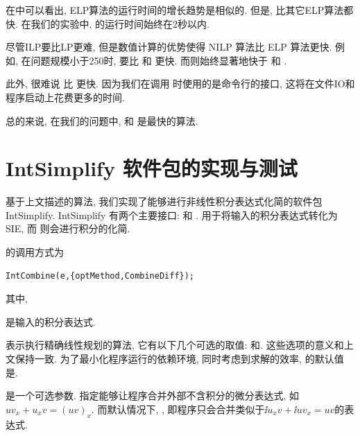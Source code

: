 在中可以看出, ELP算法的运行时间的增长趋势是相似的. 但是, 比其它ELP算法都快. 在我们的实验中, 的运行时间始终在2秒以内. 

尽管ILP要比LP更难, 但是数值计算的优势使得 NILP 算法比 ELP 算法更快. 例如, 在问题规模小于250时,  要比  和 更快. 而则始终显著地快于 和 . 

此外, 很难说  比  更快. 因为我们在调用 时使用的是命令行的接口, 这将在文件IO和程序启动上花费更多的时间.

总的来说, 在我们的问题中,  和  是最快的算法. 

\section{IntSimplify 软件包的实现与测试}\label{Results-03}
基于上文描述的算法, 我们实现了能够进行非线性积分表达式化简的软件包 IntSimplify. IntSimplify 有两个主要接口:  和 .  用于将输入的积分表达式转化为SIE, 而 则会进行积分的化简.

的调用方式为
\begin{verbatim}
IntCombine(e,{optMethod,CombineDiff});
\end{verbatim}
其中, 
\begin{compactitem}[\textbullet]
\item {}是输入的积分表达式.
\item {}表示执行精确线性规划的算法, 它有以下几个可选的取值: 和. 这些选项的意义和上文保持一致. 为了最小化程序运行的依赖环境, 同时考虑到求解的效率, 的默认值是. 
\item {}是一个可选参数. 指定能够让程序合并外部不含积分的微分表达式, 如$uv_x+u_xv=(uv)_x$. 而默认情况下, , 即程序只会合并类似于$\ii{u_xv}+\ii{uv_x}=uv$的表达式. 
\end{compactitem}

